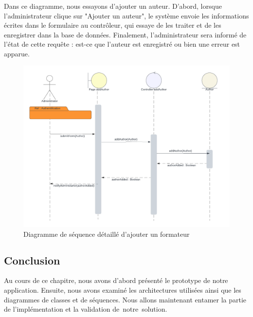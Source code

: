 Dans ce diagramme, nous essayons d'ajouter un auteur. D'abord, lorsque l'administrateur clique sur "Ajouter un auteur", le système envoie les informations écrites dans le formulaire au contrôleur, qui essaye de les traiter et de les enregistrer dans la base de données. Finalement, l'administrateur sera informé de l'état de cette requête : est-ce que l'auteur est enregistré ou bien une erreur est apparue.
\begin{figure}[H]
    \centering
    \includegraphics[width=19cm]{Figures/addAuthorSequence.png}
    \caption{Diagramme de séquence détaillé d’ajouter un formateur}
\end{figure}

\newpage
\subsection*{Conclusion}
Au cours de ce chapitre, nous avons d'abord présenté le prototype de notre application. Ensuite, nous avons examiné les architectures utilisées ainsi que les diagrammes de classes et de séquences. Nous allons maintenant entamer la partie de l'implémentation et la validation de notre solution.
